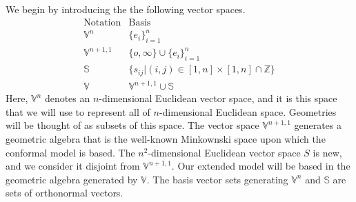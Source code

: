 \documentclass{birkjour}
\theoremstyle{definition}
\theoremstyle{remark}
\numberwithin{equation}{section}
\newcommand{\V}{\mathbb{V}}
\newcommand{\VS}{\mathbb{S}}
\newcommand{\nvao}{o}
\newcommand{\nvai}{\infty}
\begin{document}
We begin by introducing the the following vector spaces.
\begin{equation}
\begin{array}{ll}
\mbox{Notation} & \mbox{Basis} \\
\hline
\V^n & \{e_i\}_{i=1}^n \\
\V^{n+1,1} & \{\nvao,\nvai\}\cup\{e_i\}_{i=1}^n \\
\VS & \{s_{ij}|(i,j)\in[1,n]\times[1,n]\cap\mathbb{Z}\} \\
\V & \V^{n+1,1}\cup\VS
\end{array}
\end{equation}
Here, $\V^n$ denotes an $n$-dimensional Euclidean vector space, and it is this
space that we will use to represent all of $n$-dimensional Euclidean space.  Geometries
will be thought of as subsets of this space.  The vector space $\V^{n+1,1}$ generates
a geometric algebra that is the well-known Minkownski space upon which the conformal
model is based.  The $n^2$-dimensional Euclidean vector space $S$ is new, and we consider
it disjoint from $\V^{n+1,1}$.  Our extended model will be based in the geometric algebra
generated by $\V$.  The basis vector sets generating $\V^n$ and $\VS$ are 
sets of orthonormal vectors.
\end{document}
